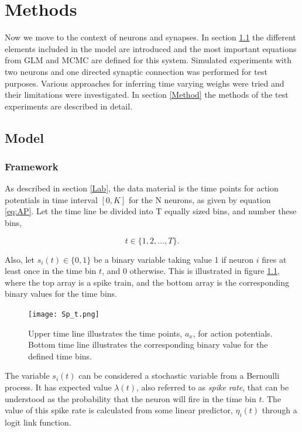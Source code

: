 
\chapter{Methods}

Now we move to the context of neurons and synapses. In section \ref{set_up} the different elements included in the model are introduced and the most important equations from GLM and MCMC are defined for this system. Simulated experiments with two neurons and one directed synaptic connection was performed for test purposes. Various approaches for inferring time varying weighs were tried and their limitations were investigated. In section \ref{Method} the methods of the test experiments are described in detail.

\section{Model}
\label{set_up}

\subsection{Framework}
As described in section \ref{Lab}, the data material is the time points for action potentials in time interval $[0,K]$ for the N neurons, as given by equation \ref{eq:AP}. Let the time line be divided into T equally sized bins, and number these bins,

\begin{equation}
    t \in \{1, 2, ..., T\}.
\end{equation}

Also, let $s_{i}(t) \in \{0,1\}$ be a binary variable taking value 1 if neuron $i$ fires at least once in the time bin $t$, and 0 otherwise. This is illustrated in figure \ref{fig:spike_train}, where the top array is a spike train, and the bottom array is the corresponding binary values for the time bins.

\begin{figure}[h]
\caption{Upper time line illustrates the time points, $a_x$, for action potentials. Bottom time line illustrates the corresponding binary value for the defined time bins.}
\label{fig:spike_train}
    \centering
    \texttt{[image: Sp\_t.png]}
\end{figure} 

The variable $s_{i}(t)$ can be considered a stochastic variable from a Bernoulli process. It has expected value $\lambda (t)$, also referred to as \textit{spike rate}, that can be understood as the probability that the neuron will fire in the time bin $t$. The value of this spike rate is calculated from some linear predictor, $\eta_i(t)$ through a logit link function. 


